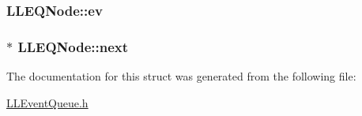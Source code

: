 \subsubsection[{\texorpdfstring{ev}{ev}}]{ L\+L\+E\+Q\+Node\+::ev}\hypertarget{struct_l_l_e_q_node_a93737f2108ade25891fbbc3359a62e32}{}\label{struct_l_l_e_q_node_a93737f2108ade25891fbbc3359a62e32}
\subsubsection[{\texorpdfstring{next}{next}}]{$\ast$ L\+L\+E\+Q\+Node\+::next}\hypertarget{struct_l_l_e_q_node_a7c95e7d5f2e3d03def48228b509212f6}{}\label{struct_l_l_e_q_node_a7c95e7d5f2e3d03def48228b509212f6}


The documentation for this struct was generated from the following file\+:\begin{DoxyCompactItemize}
\item 
\hyperlink{_l_l_event_queue_8h}{L\+L\+Event\+Queue.\+h}\end{DoxyCompactItemize}
